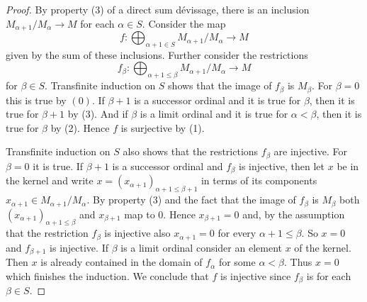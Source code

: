 \documentclass[10pt,a4paper]{amsart}
\theoremstyle{plain}
\theoremstyle{definition}
\theoremstyle{remark}
\numberwithin{equation}{subsection}
\begin{document}
\begin{proof}
By property (3) of a direct sum d\'evissage, there is an inclusion
$M_{\alpha + 1}/M_{\alpha} \to M$ for each $\alpha \in S$.  Consider the
map
$$
f : \bigoplus\nolimits_{\alpha + 1\in S} M_{\alpha + 1}/M_{\alpha} \to M
$$
given by the sum of these inclusions.
Further consider the restrictions
$$
f_{\beta} :
\bigoplus\nolimits_{\alpha + 1 \leq \beta} M_{\alpha + 1}/M_{\alpha}
\longrightarrow
M
$$
for $\beta\in S$. Transfinite induction on $S$ shows that the image of
$f_{\beta}$ is $M_{\beta}$. For $\beta=0$ this is true by $(0)$. If $\beta+1$
is a successor ordinal and it is true for $\beta$, then it is true for 
$\beta + 1$ by (3).  And if $\beta$ is a limit ordinal and it is true for
$\alpha < \beta$, then it is true for $\beta$ by (2). Hence $f$ is surjective
by (1).  

\medskip\noindent
Transfinite induction on $S$ also shows that the restrictions $f_{\beta}$
are injective. For $\beta = 0$ it is true. If $\beta+1$ is a
successor ordinal and $f_{\beta}$ is injective, then let $x$ be in the kernel
and write $x = (x_{\alpha + 1})_{\alpha + 1 \leq \beta + 1}$ in terms of its
components $x_{\alpha + 1} \in M_{\alpha + 1}/M_{\alpha}$.  By property (3) and
the fact that the image of $f_{\beta}$ is $M_{\beta}$ both
$(x_{\alpha + 1})_{\alpha + 1 \leq \beta}$ and $x_{\beta + 1}$ map to $0$.
Hence $x_{\beta+1} = 0$ and, by the assumption that the restriction
$f_{\beta}$ is injective also $x_{\alpha + 1} = 0$
for every $\alpha + 1 \leq \beta$.  So $x = 0$ and $f_{\beta+1}$ is injective.
If $\beta$ is a limit ordinal consider an element $x$ of the kernel. Then $x$
is already contained in the domain of $f_{\alpha}$ for some $\alpha < \beta$.
Thus $x = 0$ which finishes the induction.
We conclude that $f$ is injective since $f_{\beta}$ is for each $\beta \in S$.
\end{proof}
\end{document}
